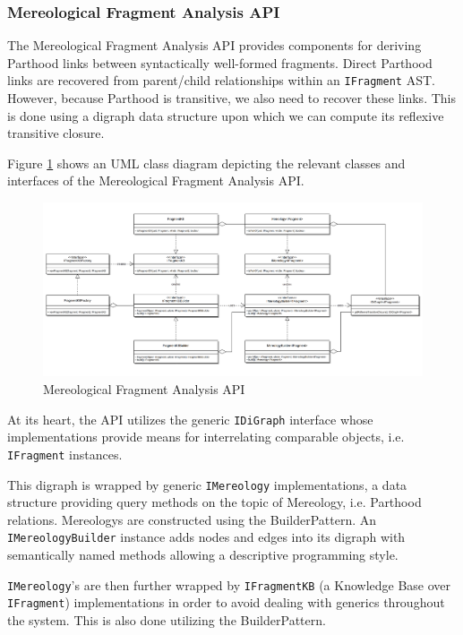 \subsubsection{Mereological Fragment Analysis API}
\label{subsubsection:MereologicalFragmentAnalysisAPI}
The Mereological Fragment Analysis \gls{API} provides components for deriving \gls{Parthood} links between syntactically well-formed fragments.
Direct \gls{Parthood} links are recovered from parent/child relationships within an \texttt{IFragment} \gls{AST}.
However, because \gls{Parthood} is transitive, we also need to recover these links.
This is done using a digraph data structure upon which we can compute its reflexive transitive closure.

Figure \ref{figure:MereologicalFragmentAnalysisAPI} shows an \gls{UML} class diagram depicting the relevant classes and interfaces of the Mereological Fragment Analysis \gls{API}.
\begin{figure}[h!]
\begin{center}
\includegraphics[width=\textwidth]{images/MereologicalFragmentAnalysisAPI.png}
\end{center}
\caption{Mereological Fragment Analysis API}
\label{figure:MereologicalFragmentAnalysisAPI}
\end{figure}
At its heart, the \gls{API} utilizes the generic \texttt{IDiGraph} interface whose implementations provide means for interrelating comparable objects, i.e. \texttt{IFragment} instances.

This digraph is wrapped by generic \texttt{IMereology} implementations, a data structure providing query methods on the topic of \gls{Mereology}, i.e. \gls{Parthood} relations.
\Glspl{Mereology} are constructed using the \gls{BuilderPattern}.
An \texttt{IMereology\-Builder} instance adds nodes and edges into its digraph with semantically named methods allowing a descriptive programming style.

\texttt{IMereology}'s are then further wrapped by \texttt{IFragmentKB} (a Knowledge Base over \texttt{IFragment}) implementations in order to avoid dealing with generics throughout the system.
This is also done utilizing the \gls{BuilderPattern}.

